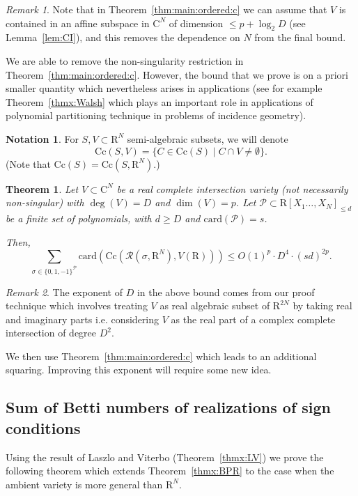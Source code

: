 \documentclass[10pt]{amsart}
\newtheorem{theorem}{Theorem}
\theoremstyle{definition}
\newtheorem{notation}{Notation}[section]
\theoremstyle{remark}
\newtheorem{remark}{Remark}
\numberwithin{equation}{section}
\newcommand {\R} {\mathrm{R}}
\newcommand {\C}     {\mathrm{C}}
\newcommand {\RR} {{\mathcal R}}
\newcommand{\card}{\mathrm{card}}
\newcommand{\Cc}{\mathrm{Cc}}
\begin{document}
\begin{remark}
Note that in Theorem~\ref{thm:main:ordered:c} we can assume that
$V$ is contained in an affine subspace in $\C^N$ of dimension $\leq p + \log_2 D$
(see Lemma~\ref{lem:CI}),
and this removes the dependence on $N$ from the final bound.
\end{remark}




We are able to remove the non-singularity restriction 
in Theorem~\ref{thm:main:ordered:c}.
However, the bound that we prove is on a priori smaller quantity which nevertheless arises in applications
(see for example Theorem~\ref{thmx:Walsh} which plays an important role in applications of polynomial partitioning technique in problems of incidence geometry).

\begin{notation}
    For $S, V \subset \R^N$ semi-algebraic subsets, we will denote
    \[
    \Cc(S,V) = \{C \in \Cc(S) \mid C \cap V \neq \emptyset\}.
    \]
    (Note that $\Cc(S) = \Cc(S,\R^N)$.)
\end{notation}

\begin{theorem}
\label{thm:main:ordered:c'}
Let $V \subset \C^N$ be a real complete intersection variety (not necessarily non-singular)
with $\deg(V) = D$ and $\dim(V) = p$. 
  Let
    $\mathcal{P} \subset \R[X_1\ldots,X_N]_{\leq d}$ be a finite set of polynomials, with $d \geq D$ and $\card(\mathcal{P}) = s$. 
    
    Then,
    \[
        \sum_{\sigma \in \{0,1,-1\}^{\mathcal{P}}} 
        \card(\Cc(\RR(\sigma,\R^{N}),V(\R)))
        \leq 
        O(1)^p \cdot D^4 \cdot (s d)^{2p}.
    \]  
\end{theorem}

\begin{remark}
The exponent of $D$ in the above bound comes from our proof technique which involves treating
$V$ as real algebraic subset of $\R^{2N}$ by taking real and imaginary parts i.e. considering $V$ as the real part of a complex complete intersection of degree $D^2$. 

We then use Theorem~\ref{thm:main:ordered:c} which leads to an additional squaring. Improving this exponent will require some new idea. 
\end{remark}

\subsection{Sum of Betti numbers of realizations of sign conditions}
Using the result of Laszlo and Viterbo (Theorem~\ref{thmx:LV}) we prove the following theorem which extends Theorem~\ref{thmx:BPR} to the case when the ambient variety is more general than $\R^N$.
\end{document}
